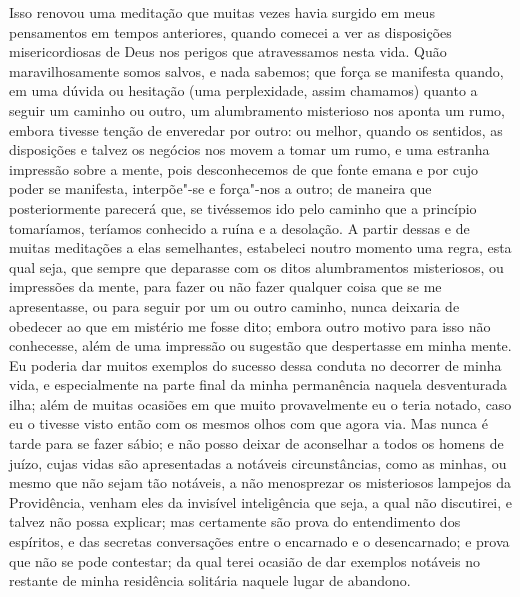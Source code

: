 Isso renovou uma meditação que muitas vezes havia surgido em meus
pensamentos em tempos anteriores, quando comecei a ver as disposições
misericordiosas de Deus nos perigos que atravessamos nesta vida. Quão
maravilhosamente somos salvos, e nada sabemos; que força se manifesta
quando, em uma dúvida ou hesitação (uma perplexidade, assim chamamos)
quanto a seguir um caminho ou outro, um alumbramento misterioso nos
aponta um rumo, embora tivesse tenção de enveredar por outro: ou melhor,
quando os sentidos, as disposições e talvez os negócios nos movem a
tomar um rumo, e uma estranha impressão sobre a mente, pois
desconhecemos de que fonte emana e por cujo poder se manifesta,
interpõe"-se e força"-nos a outro; de maneira que posteriormente parecerá
que, se tivéssemos ido pelo caminho que a princípio tomaríamos, teríamos
conhecido a ruína e a desolação. A partir dessas e de muitas meditações
a elas semelhantes, estabeleci noutro momento uma regra, esta qual seja,
que sempre que deparasse com os ditos alumbramentos misteriosos, ou
impressões da mente, para fazer ou não fazer qualquer coisa que se me
apresentasse, ou para seguir por um ou outro caminho, nunca deixaria de
obedecer ao que em mistério me fosse dito; embora outro motivo para isso
não conhecesse, além de uma impressão ou sugestão que despertasse em
minha mente. Eu poderia dar muitos exemplos do sucesso dessa conduta no
decorrer de minha vida, e especialmente na parte final da minha
permanência naquela desventurada ilha; além de muitas ocasiões em que
muito provavelmente eu o teria notado, caso eu o tivesse visto então com
os mesmos olhos com que agora via. Mas nunca é tarde para se fazer
sábio; e não posso deixar de aconselhar a todos os homens de juízo,
cujas vidas são apresentadas a notáveis circunstâncias, como as minhas,
ou mesmo que não sejam tão notáveis, a não menosprezar os misteriosos
lampejos da Providência, venham eles da invisível inteligência que seja,
a qual não discutirei, e talvez não possa explicar; mas certamente são
prova do entendimento dos espíritos, e das secretas conversações entre o
encarnado e o desencarnado; e prova que não se pode contestar; da qual
terei ocasião de dar exemplos notáveis no restante de minha residência
solitária naquele lugar de abandono.

